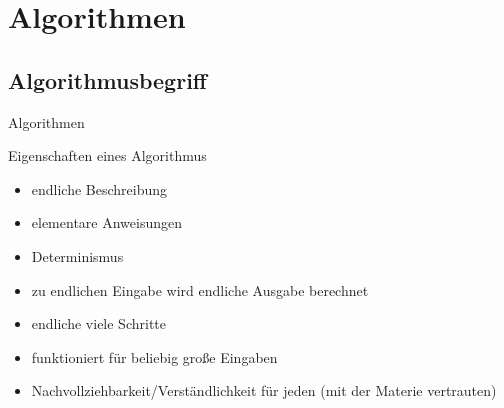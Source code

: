 \section{Algorithmen}
\subsection{Algorithmusbegriff}

\begin{frame}{Algorithmen}
\begin{block}{Eigenschaften eines Algorithmus}
\begin{itemize}
  \item endliche Beschreibung
  \item elementare Anweisungen
  \item Determinismus
  \item zu endlichen Eingabe wird endliche Ausgabe berechnet
  \item endliche viele Schritte
  \item funktioniert für beliebig große Eingaben
  \item Nachvollziehbarkeit/Verständlichkeit für jeden (mit der Materie vertrauten)
  \end{itemize}
\end{block}
    


\end{frame}


